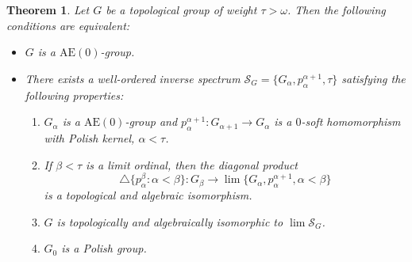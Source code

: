\documentclass[12pt,draft]{amsart}
\theoremstyle{plain}
\newtheorem{thm}{Theorem}[section]
\theoremstyle{definition}
\numberwithin{equation}{section}
\begin{document}

\begin{thm}\label{T:ae0}
Let $G$ be a topological group of weight $\tau > \omega$.
Then the following conditions are equivalent:
\begin{itemize}
\item[(a)]
$G$ is a $\text{AE}(0)$-group.
\item[(b)]
There exists a well-ordered inverse spectrum
${\mathcal S}_{G} = \{ G_{\alpha},
p_{\alpha}^{\alpha +1},\tau \}$ satisfying the following properties:
\begin{enumerate}
\item
$G_{\alpha}$ is a $\text{AE}(0)$-group and $p^{\alpha +1}_{\alpha}
\colon G_{\alpha +1} \to G_{\alpha}$ is a $0$-soft
homomorphism with Polish kernel, $\alpha < \tau$.
\item
If $\beta < \tau$ is a limit ordinal, then the diagonal product 
\[\triangle\{ p_{\alpha}^{\beta} \colon \alpha < \beta\}
\colon G_{\beta} \to \lim\{ G_{\alpha},
p_{\alpha}^{\alpha+1}, \alpha < \beta \}\]
is a topological and algebraic isomorphism.
\item
$G$ is topologically and algebraically isomorphic to
$\lim {\mathcal S}_{G}$.
\item
$G_{0}$ is a Polish group. 
\end{enumerate}
\end{itemize}
\end{thm}
\end{document}

